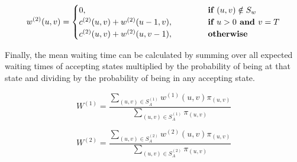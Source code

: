 \begin{equation} \label{eq:waiting-time-at-each-state-type-2}
    w^{(2)}(u,v) = 
    \begin{cases} 
        0, \hspace{4.85cm} & \textbf{if } (u,v) \notin S_w \\
        c^{(2)}(u,v) + w^{(2)}(u-1, v), & \textbf{if } u > 0 \textbf{ and } v = T \\
        c^{(2)}(u,v) + w^{(2)}(u, v-1), & \textbf{otherwise}
    \end{cases}
\end{equation}

Finally, the mean waiting time can be calculated by summing over all expected 
waiting times of accepting states multiplied by the probability of being at that 
state and dividing by the probability of being in any accepting state.

\begin{equation} \label{eq:recursive-waiting-time-type-1}
    W^{(1)} = \frac{\sum_{(u,v) \in S_A^{(1)}} w^{(1)}(u,v) 
    \pi_{(u,v)}}{\sum_{(u,v) \in S_A^{(1)}} \pi_{(u,v)}}
\end{equation}

\begin{equation}\label{eq:recursive-waiting-time-type-2}
    W^{(2)} = \frac{\sum_{(u,v) \in S_A^{(2)}} w^{(2)}(u,v) \pi_{(u,v)}}
    {\sum_{(u,v) \in S_A^{(2)}} \pi_{(u,v)}}
\end{equation}

